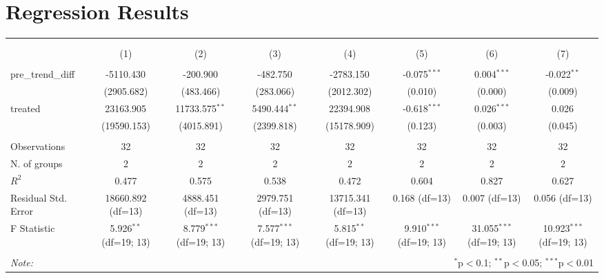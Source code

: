 \documentclass{article}%
\begin{document}
%
\normalsize%
\section{Regression Results}%
\label{sec:RegressionResults}%

    \begin{table}[!htbp] \centering
    \begin{tabular}{@{\extracolsep{5pt}}lccccccc}
    \\[-1.8ex]\hline
    \hline \\[-1.8ex]
    \\[-1.8ex] & (1) & (2) & (3) & (4) & (5) & (6) & (7) \\
    \hline \\[-1.8ex]
     pre_trend_diff & -5110.430$^{}$ & -200.900$^{}$ & -482.750$^{}$ & -2783.150$^{}$ & -0.075$^{***}$ & 0.004$^{***}$ & -0.022$^{**}$ \\
    & (2905.682) & (483.466) & (283.066) & (2012.302) & (0.010) & (0.000) & (0.009) \\
     treated & 23163.905$^{}$ & 11733.575$^{**}$ & 5490.444$^{**}$ & 22394.908$^{}$ & -0.618$^{***}$ & 0.026$^{***}$ & 0.026$^{}$ \\
    & (19590.153) & (4015.891) & (2399.818) & (15178.909) & (0.123) & (0.003) & (0.045) \\
    \hline \\[-1.8ex]
     Observations & 32 & 32 & 32 & 32 & 32 & 32 & 32 \\
     N. of groups & 2 & 2 & 2 & 2 & 2 & 2 & 2 \\
     $R^2$ & 0.477 & 0.575 & 0.538 & 0.472 & 0.604 & 0.827 & 0.627 \\
     Residual Std. Error & 18660.892 (df=13) & 4888.451 (df=13) & 2979.751 (df=13) & 13715.341 (df=13) & 0.168 (df=13) & 0.007 (df=13) & 0.056 (df=13) \\
     F Statistic & 5.926$^{**}$ (df=19; 13) & 8.779$^{***}$ (df=19; 13) & 7.577$^{***}$ (df=19; 13) & 5.815$^{**}$ (df=19; 13) & 9.910$^{***}$ (df=19; 13) & 31.055$^{***}$ (df=19; 13) & 10.923$^{***}$ (df=19; 13) \\
    \hline
    \hline \\[-1.8ex]
    \textit{Note:} & \multicolumn{7}{r}{$^{*}$p$<$0.1; $^{**}$p$<$0.05; $^{***}$p$<$0.01} \\
    \end{tabular}
    \end{table}
    

%
\end{document}
